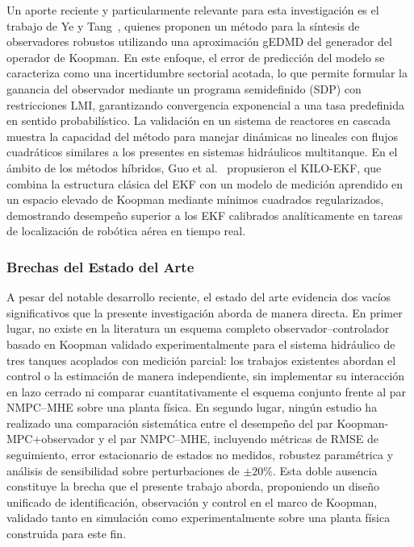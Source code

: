 \documentclass[12pt,letterpaper]{article}
\begin{document}
Un aporte reciente y particularmente relevante para esta investigación es el trabajo
de Ye y Tang~\cite{ye2025}, quienes proponen un método para la síntesis de
observadores robustos utilizando una aproximación gEDMD del generador del operador de
Koopman. En este enfoque, el error de predicción del modelo se caracteriza como una
incertidumbre sectorial acotada, lo que permite formular la ganancia del observador
mediante un programa semidefinido (SDP) con restricciones LMI, garantizando
convergencia exponencial a una tasa predefinida en sentido probabilístico. La
validación en un sistema de reactores en cascada muestra la capacidad del método para
manejar dinámicas no lineales con flujos cuadráticos similares a los presentes en
sistemas hidráulicos multitanque. En el ámbito de los métodos híbridos, Guo et
al.~\cite{kiloekf2026} propusieron el KILO-EKF, que combina la estructura clásica del
EKF con un modelo de medición aprendido en un espacio elevado de Koopman mediante
mínimos cuadrados regularizados, demostrando desempeño superior a los EKF calibrados
analíticamente en tareas de localización de robótica aérea en tiempo real.


\subsubsection*{Brechas del Estado del Arte}

A pesar del notable desarrollo reciente, el estado del arte evidencia dos vacíos
significativos que la presente investigación aborda de manera directa. En primer
lugar, no existe en la literatura un esquema completo observador--controlador basado
en Koopman validado experimentalmente para el sistema hidráulico de tres tanques
acoplados con medición parcial: los trabajos existentes abordan el control o la
estimación de manera independiente, sin implementar su interacción en lazo cerrado ni
comparar cuantitativamente el esquema conjunto frente al par NMPC--MHE sobre una
planta física. En segundo lugar, ningún estudio ha realizado una comparación
sistemática entre el desempeño del par Koopman-MPC+observador y el par NMPC--MHE,
incluyendo métricas de RMSE de seguimiento, error estacionario de estados no medidos,
robustez paramétrica y análisis de sensibilidad sobre perturbaciones de $\pm20\%$.
Esta doble ausencia constituye la brecha que el presente trabajo aborda, proponiendo
un diseño unificado de identificación, observación y control en el marco de Koopman,
validado tanto en simulación como experimentalmente sobre una planta física
construida para este fin.
\end{document}
